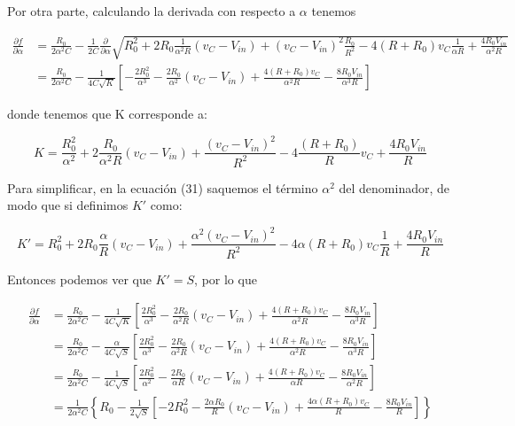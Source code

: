 \documentclass[
  11pt,
  letterpaper,
   addpoints,
   answers
  ]{exam}
\begin{document}
\begin{questions}
\begin{solution}
Por otra parte, calculando la derivada con respecto a \(\alpha\) tenemos

\begin{align}
\frac{\partial f}{\partial \alpha} 
&= \frac{R_0}{2\alpha^2 C} 
   - \frac{1}{2C} \frac{\partial}{\partial \alpha} 
     \sqrt{R_0^2 
     + 2R_0 \frac{1}{\alpha^2 R} (v_C - V_{in}) 
     + (v_C - V_{in})^2 \frac{R_0}{R^2} 
     - 4(R + R_0) v_C \frac{1}{\alpha R} 
     + \frac{4R_0 V_{in}}{\alpha^2 R}} \\[6pt]
&= \frac{R_0}{2\alpha^2 C} 
   - \frac{1}{4C \sqrt{K}} 
     \left[
       - \frac{2R_0^2}{\alpha^3}
       - \frac{2R_0}{\alpha^2}(v_C - V_{in})
       + \frac{4(R + R_0)v_C}{\alpha^2 R}
       - \frac{8R_0 V_{in}}{\alpha^3 R}
     \right]
\end{align}


donde tenemos que K corresponde a:

\begin{equation}
K = \frac{R_0^2}{\alpha^2} + 2 \frac{R_0}{\alpha^2 R} (v_C - V_{in}) + \frac{(v_C - V_{in})^2}{R^2} - 4 \frac{(R + R_0)}{R} v_C + \frac{4R_0 V_{in}}{R}
\end{equation}

Para simplificar, en la ecuación (31) saquemos el término \(\alpha^2\) del denominador, de modo que si definimos \(K'\) como:

\begin{equation}
K' = R_0^2 + 2R_0 \frac{\alpha}{R} (v_C - V_{in}) + \frac{\alpha^2 (v_C - V_{in})^2}{R^2} - 4\alpha (R + R_0) v_C \frac{1}{R} + \frac{4R_0 V_{in}}{R}
\end{equation}

Entonces podemos ver que \(K' = S\), por lo que

\begin{align}
\frac{\partial f}{\partial \alpha} 
&= \frac{R_0}{2\alpha^2 C} 
   - \frac{1}{4 C \sqrt{K}}
     \left[
       \frac{2R_0^2}{\alpha^3}
       - \frac{2R_0}{\alpha^2 R}(v_C - V_{in})
       + \frac{4(R+R_0)v_C}{\alpha^2 R}
       - \frac{8R_0 V_{in}}{\alpha^3 R}
     \right] \\[6pt]
&= \frac{R_0}{2\alpha^2 C} 
   - \frac{\alpha}{4 C \sqrt{S}}
     \left[
       \frac{2R_0^2}{\alpha^3}
       - \frac{2R_0}{\alpha^2 R}(v_C - V_{in})
       + \frac{4(R+R_0)v_C}{\alpha^2 R}
       - \frac{8R_0 V_{in}}{\alpha^3 R}
     \right] \\[6pt]
&= \frac{R_0}{2\alpha^2 C} 
   - \frac{1}{4 C \sqrt{S}}
     \left[
       \frac{2R_0^2}{\alpha^2}
       - \frac{2R_0}{\alpha R}(v_C - V_{in})
       + \frac{4(R+R_0)v_C}{\alpha R}
       - \frac{8R_0 V_{in}}{\alpha^2 R}
     \right] \\[6pt]
&= \frac{1}{2\alpha^2 C}
   \left\{
     R_0 - \frac{1}{2\sqrt{S}}
     \left[
       -2R_0^2
       - \frac{2\alpha R_0}{R}(v_C - V_{in})
       + \frac{4\alpha(R+R_0)v_C}{R}
       - \frac{8R_0 V_{in}}{R}
     \right]
   \right\}
\end{align}


\end{solution}
\end{questions}
\end{document}

